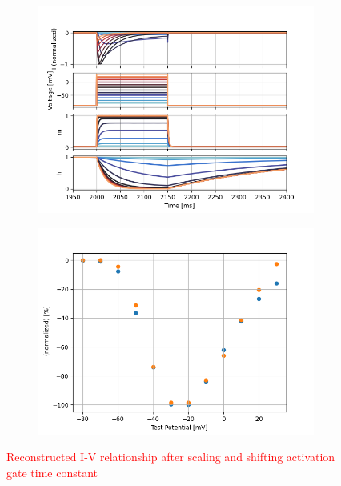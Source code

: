 \documentclass[../../workflow.tex]{subfiles}
\begin{document}
\begin{figure}[H]
    \centering
    \begin{subfigure}[t]{0.45\textwidth}
        \centering
        \includegraphics[width=\textwidth]{./img/t_type_calcium_channel/simulations/Scaling/Constant Field EquationVoltage Step Up-Down6_voltage_traces.png}
        \caption{}
        \label{fig_t_type_constant_field_voltage_traces_scaled}
    \end{subfigure}
    \hfill
    \begin{subfigure}[t]{0.45\textwidth}
        \centering
        \includegraphics[width=\textwidth]{./img/t_type_calcium_channel/simulations/Scaling/Constant Field EquationVoltage Step5_IV_Relationship_comparison_Jeong_2015.png}
        \caption{}
        \label{fig_t_type_constant_field_iv_relationship_scaled}
    \end{subfigure}
    
    \caption{\textcolor{red}{Reconstructed I-V relationship after scaling and shifting activation gate time constant}}
    \label{fig_t_type_voltage_step_ohmic_vs_constant_field_scaled}
\end{figure}
\end{document}
